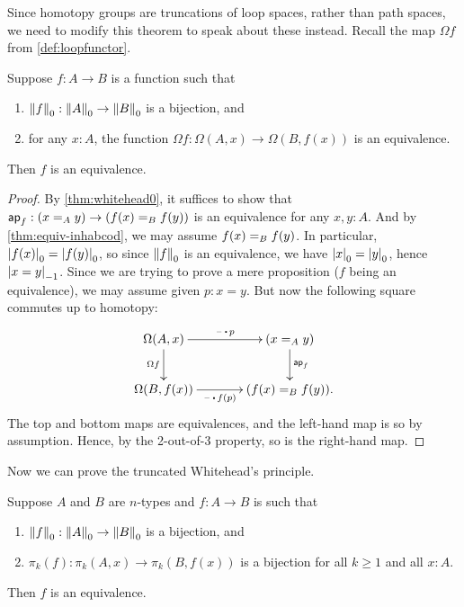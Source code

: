 Since homotopy groups are truncations of loop spaces, rather than path spaces, we need to modify this theorem to speak about these instead. Recall the map $\Omega f$ from \cref{def:loopfunctor}.

\begin{cor}\label{thm:whitehead1}
  Suppose $f:A\to B$ is a function such that
  \begin{enumerate}
  \item $\trunc0 f : \trunc0 A \to \trunc0 B$ is a bijection, and
  \item for any $x:A$, the function $\Omega f : \Omega(A,x) \to \Omega(B,f(x))$ is an equivalence.
  \end{enumerate}
  Then $f$ is an equivalence.
\end{cor}
\begin{proof}
  By \cref{thm:whitehead0}, it suffices to show that $\apfunc f : (\id[A]xy) \to (\id[B]{f(x)}{f(y)})$ is an equivalence for any $x,y:A$.
  And by \cref{thm:equiv-inhabcod}, we may assume $\id[B]{f(x)}{f(y)}$.
  In particular, $\tproj0{f(x)} = \tproj0{f(y)}$, so since $\trunc0 f$ is an equivalence, we have $\tproj0 x = \tproj0y$, hence $\tproj{-1}{x=y}$.
  Since we are trying to prove a mere proposition ($f$ being an equivalence), we may assume given $p:x=y$.
  But now the following square commutes up to homotopy:
  \begin{equation*}
  \vcenter{\xymatrix@C=3pc{
      \Omega(A,x)\ar[r]^-{\blank\ct p}\ar[d]_{\Omega f} &
      (\id[A]xy) \ar[d]^{\apfunc f}\\
      \Omega(B,f(x))\ar[r]_-{\blank\ct f(p)} &
      (\id[B]{f(x)}{f(y)}).
      }}
  \end{equation*}
  The top and bottom maps are equivalences, and the left-hand map is so by assumption.
  Hence, by the 2-out-of-3 property, so is the right-hand map.
\end{proof}

Now we can prove the truncated Whitehead's principle.

\begin{thm}\label{thm:whiteheadn}
  Suppose $A$ and $B$ are $n$-types and $f:A\to B$ is such that
  \begin{enumerate}
  \item $\trunc0f:\trunc0A \to \trunc0B$ is a bijection, and\label{item:wh0}
  \item $\pi_k(f):\pi_k(A,x) \to \pi_k(B,f(x))$ is a bijection for all $k\ge 1$ and all $x:A$.\label{item:whk}
  \end{enumerate}
  Then $f$ is an equivalence.
\end{thm}

